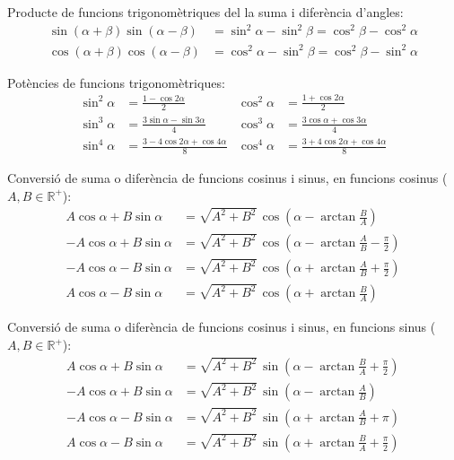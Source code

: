 Producte de funcions trigonom\`{e}triques del la suma i difer\`{e}ncia
d'angles:
\begin{subequations}
\begin{align}
    \sin(\alpha+\beta) \sin(\alpha-\beta) &= \sin^2\alpha-\sin^2\beta =
    \cos^2\beta - \cos^2\alpha\\[1ex]
    \cos(\alpha+\beta) \cos(\alpha-\beta) &= \cos^2\alpha-\sin^2\beta =
    \cos^2\beta - \sin^2\alpha
\end{align}
\end{subequations}

Pot\`{e}ncies de funcions trigonom\`{e}triques:
\begin{subequations}
\begin{align}
    \sin^2\alpha &= \frac{1-\cos 2\alpha}{2} &  \cos^2\alpha &= \frac{1+\cos 2\alpha}{2}\\[1ex]
    \sin^3\alpha &= \frac{3\sin\alpha-\sin 3\alpha}{4} &  \cos^3\alpha &= \frac{3\cos\alpha+\cos 3\alpha}{4}\\[1ex]
    \sin^4\alpha &= \frac{3-4\cos 2\alpha+\cos 4\alpha}{8} &  \cos^4\alpha &= \frac{3+4\cos 2\alpha+\cos 4\alpha}{8}
\end{align}
\end{subequations}

Conversi\'{o} de suma o difer\`{e}ncia de funcions cosinus i sinus, en
funcions cosinus ($A,B\in\mathbb{R}^+$):
\begin{subequations}
\begin{align}
    A \cos \alpha +B \sin \alpha &= \sqrt{A^2+B^2}\, \cos \left(\alpha - \arctan\frac{B}{A}\right)\label{eq:AcosBsin}\\
    -A \cos \alpha +B \sin \alpha &= \sqrt{A^2+B^2}\, \cos \left(\alpha - \arctan\frac{A}{B} - \frac{\pi}{2}\right)\\
    -A \cos \alpha -B \sin \alpha &= \sqrt{A^2+B^2}\, \cos \left(\alpha + \arctan\frac{A}{B} + \frac{\pi}{2}\right)\label{eq:-Acos-Bsin}\\
    A \cos \alpha -B \sin \alpha &= \sqrt{A^2+B^2}\, \cos \left(\alpha + \arctan\frac{B}{A}\right)
\end{align}
\end{subequations}

Conversi\'{o} de suma o difer\`{e}ncia de funcions cosinus i sinus, en
funcions sinus ($A,B\in\mathbb{R}^+$):
\begin{subequations}
\begin{align}
    A \cos \alpha +B \sin \alpha &= \sqrt{A^2+B^2}\, \sin \left(\alpha - \arctan\frac{B}{A} +\frac{\pi}{2}\right)\\
    -A \cos \alpha +B \sin \alpha &= \sqrt{A^2+B^2}\, \sin \left(\alpha - \arctan\frac{A}{B}\right)\\
    -A \cos \alpha -B \sin \alpha &= \sqrt{A^2+B^2}\, \sin \left(\alpha + \arctan\frac{A}{B} + \pi\right)\\
    A \cos \alpha -B \sin \alpha &= \sqrt{A^2+B^2}\, \sin \left(\alpha + \arctan\frac{B}{A}+\frac{\pi}{2}\right)
\end{align}
\end{subequations}


